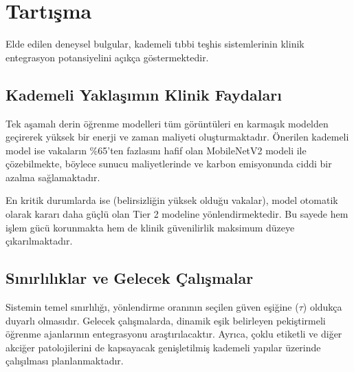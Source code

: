 \chapter{Tartışma}
\label{ch:tartisma}

Elde edilen deneysel bulgular, kademeli tıbbi teşhis sistemlerinin klinik entegrasyon potansiyelini açıkça göstermektedir.

\section{Kademeli Yaklaşımın Klinik Faydaları}
Tek aşamalı derin öğrenme modelleri tüm görüntüleri en karmaşık modelden geçirerek yüksek bir enerji ve zaman maliyeti oluşturmaktadır. Önerilen kademeli model ise vakaların \%65'ten fazlasını hafif olan MobileNetV2 modeli ile çözebilmekte, böylece sunucu maliyetlerinde ve karbon emisyonunda ciddi bir azalma sağlamaktadır. 

En kritik durumlarda ise (belirsizliğin yüksek olduğu vakalar), model otomatik olarak kararı daha güçlü olan Tier 2 modeline yönlendirmektedir. Bu sayede hem işlem gücü korunmakta hem de klinik güvenilirlik maksimum düzeye çıkarılmaktadır.

\section{Sınırlılıklar ve Gelecek Çalışmalar}
Sistemin temel sınırlılığı, yönlendirme oranının seçilen güven eşiğine ($\tau$) oldukça duyarlı olmasıdır. Gelecek çalışmalarda, dinamik eşik belirleyen pekiştirmeli öğrenme ajanlarının entegrasyonu araştırılacaktır. Ayrıca, çoklu etiketli ve diğer akciğer patolojilerini de kapsayacak genişletilmiş kademeli yapılar üzerinde çalışılması planlanmaktadır.
